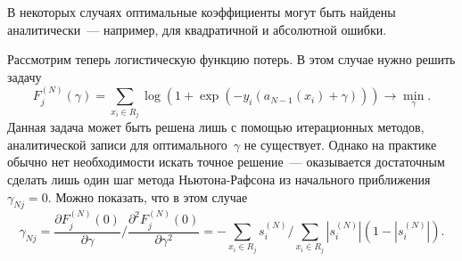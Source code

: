 \documentclass[12pt,fleqn]{article}
\begin{document}
В некоторых случаях оптимальные коэффициенты могут быть найдены аналитически~---
например, для квадратичной и абсолютной ошибки.






Рассмотрим теперь логистическую функцию потерь.
В этом случае нужно решить задачу
\[
    F_j^{(N)}(\gamma)
    =
    \sum_{x_i \in R_j}
        \log\left(
            1 + \exp\left(
                -y_i (a_{N - 1}(x_i) + \gamma)
            \right)
        \right)
    \to
    \min_{\gamma}.
\]
Данная задача может быть решена лишь с помощью итерационных методов,
аналитической записи для оптимального~$\gamma$ не существует.
Однако на практике обычно нет необходимости искать точное решение~---
оказывается достаточным сделать лишь один шаг метода Ньютона-Рафсона
из начального приближения~$\gamma_{Nj} = 0$.
Можно показать, что в этом случае
\[
    \gamma_{Nj}
    =
    \frac{\partial F_j^{(N)}(0)}{\partial \gamma}
    \Biggl/
    \frac{\partial^2 F_j^{(N)}(0)}{\partial \gamma^2}
    =
    -
    \sum_{x_i \in R_j}
        s_i^{(N)}
    \Biggl/
    \sum_{x_i \in R_j}
        |s_i^{(N)}| (1 - |s_i^{(N)}|).
\]
\end{document}
